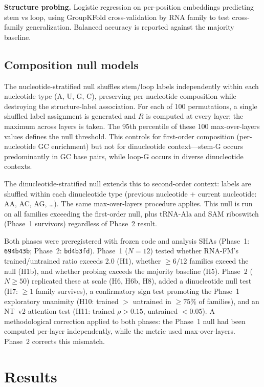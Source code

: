 \documentclass[11pt]{article}
\begin{document}
\textbf{Structure probing.}  Logistic regression on per-position
embeddings predicting stem vs loop, using GroupKFold cross-validation
by RNA family to test cross-family generalization.  Balanced accuracy
is reported against the majority baseline.

\subsection{Composition null models}
\label{sec:nulls}

The nucleotide-stratified null shuffles stem/loop labels independently
within each nucleotide type (A, U, G, C), preserving per-nucleotide
composition while destroying the structure-label association.  For
each of 100 permutations, a single shuffled label assignment is
generated and $R$ is computed at every layer; the maximum across
layers is taken.  The 95th percentile of these 100 max-over-layers
values defines the null threshold.  This controls for first-order
composition (per-nucleotide GC enrichment) but not for dinucleotide
context---stem-G occurs predominantly in GC base pairs, while loop-G
occurs in diverse dinucleotide contexts.

The dinucleotide-stratified null extends this to second-order context:
labels are shuffled within each dinucleotide type (previous nucleotide
+ current nucleotide: AA, AC, AG, \ldots).  The same max-over-layers
procedure applies.  This null is run on all families exceeding the
first-order null, plus tRNA-Ala and SAM riboswitch (Phase~1 survivors)
regardless of Phase~2 result.

Both phases were preregistered with frozen code and analysis SHAs
(Phase~1: \texttt{694b43b}; Phase~2: \texttt{bd4b3fd}).  Phase~1
($N = 12$) tested whether RNA-FM's trained/untrained ratio exceeds
2.0 (H1), whether $\geq 6/12$ families exceed the null (H1b), and
whether probing exceeds the majority baseline (H5).  Phase~2
($N \geq 50$) replicated these at scale (H6, H6b, H8), added a
dinucleotide null test (H7: $\geq 1$ family survives), a confirmatory
sign test promoting the Phase~1 exploratory unanimity (H10: trained
$>$ untrained in $\geq 75\%$ of families), and an NT~v2 attention
test (H11: trained $\rho > 0.15$, untrained $< 0.05$).  A
methodological correction applied to both phases: the Phase~1 null
had been computed per-layer independently, while the metric used
max-over-layers.  Phase~2 corrects this mismatch.


\section{Results}
\label{sec:results}
\end{document}
